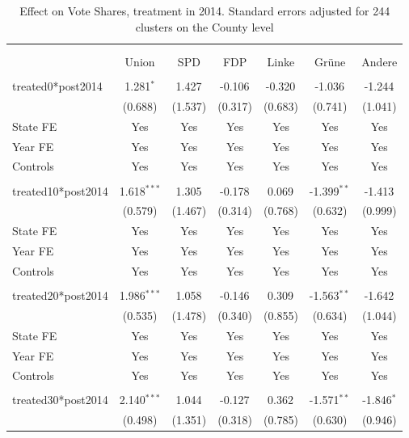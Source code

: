 \documentclass[12pt]{article}
\begin{document}
 
\begin{table}[!htbp] \centering
  \caption{Effect on Vote Shares, treatment in 2014. Standard errors adjusted for 244 clusters on the County level}
\begin{tabular}{@{\extracolsep{5pt}}lcccccc}
\\[-1.8ex]\hline
\hline \\[-1.8ex]
\\[-1.8ex] & \multicolumn{1}{c}{Union} & \multicolumn{1}{c}{SPD} & \multicolumn{1}{c}{FDP} & \multicolumn{1}{c}{Linke} & \multicolumn{1}{c}{Grüne} & \multicolumn{1}{c}{Andere}  \\
\hline \\[-1.8ex]
 treated0*post2014 & 1.281$^{*}$ & 1.427$^{}$ & -0.106$^{}$ & -0.320$^{}$ & -1.036$^{}$ & -1.244$^{}$ \\
  & (0.688) & (1.537) & (0.317) & (0.683) & (0.741) & (1.041) \\
 State FE & Yes & Yes & Yes & Yes & Yes & Yes \\
 Year FE & Yes & Yes & Yes & Yes & Yes & Yes \\
 Controls & Yes & Yes & Yes & Yes & Yes & Yes \\
\hline \\[-1.8ex]
 treated10*post2014 & 1.618$^{***}$ & 1.305$^{}$ & -0.178$^{}$ & 0.069$^{}$ & -1.399$^{**}$ & -1.413$^{}$ \\
  & (0.579) & (1.467) & (0.314) & (0.768) & (0.632) & (0.999) \\
 State FE & Yes & Yes & Yes & Yes & Yes & Yes \\
 Year FE & Yes & Yes & Yes & Yes & Yes & Yes \\
 Controls & Yes & Yes & Yes & Yes & Yes & Yes \\
\hline \\[-1.8ex]
 treated20*post2014 & 1.986$^{***}$ & 1.058$^{}$ & -0.146$^{}$ & 0.309$^{}$ & -1.563$^{**}$ & -1.642$^{}$ \\
  & (0.535) & (1.478) & (0.340) & (0.855) & (0.634) & (1.044) \\
 State FE & Yes & Yes & Yes & Yes & Yes & Yes \\
 Year FE & Yes & Yes & Yes & Yes & Yes & Yes \\
 Controls & Yes & Yes & Yes & Yes & Yes & Yes \\
\hline \\[-1.8ex]
 treated30*post2014 & 2.140$^{***}$ & 1.044$^{}$ & -0.127$^{}$ & 0.362$^{}$ & -1.571$^{**}$ & -1.846$^{*}$ \\
  & (0.498) & (1.351) & (0.318) & (0.785) & (0.630) & (0.946) \\

\end{tabular}
\end{table}
\end{document}
